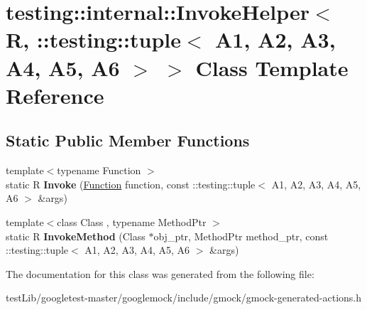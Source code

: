 \hypertarget{classtesting_1_1internal_1_1InvokeHelper_3_01R_00_01_1_1testing_1_1tuple_3_01A1_00_01A2_00_01A3_129338555c00c55487bfe9fa59e479ab}{}\section{testing\+:\+:internal\+:\+:Invoke\+Helper$<$ R, \+:\+:testing\+:\+:tuple$<$ A1, A2, A3, A4, A5, A6 $>$ $>$ Class Template Reference}
\label{classtesting_1_1internal_1_1InvokeHelper_3_01R_00_01_1_1testing_1_1tuple_3_01A1_00_01A2_00_01A3_129338555c00c55487bfe9fa59e479ab}
\subsection*{Static Public Member Functions}
\begin{DoxyCompactItemize}
\item 
\mbox{\label{classtesting_1_1internal_1_1InvokeHelper_3_01R_00_01_1_1testing_1_1tuple_3_01A1_00_01A2_00_01A3_129338555c00c55487bfe9fa59e479ab_abd80fc3954d529303e56f4410db782fc}} 
{\footnotesize template$<$typename Function $>$ }\\static R {\bfseries Invoke} (\hyperlink{structtesting_1_1internal_1_1Function}{Function} function, const \+::testing\+::tuple$<$ A1, A2, A3, A4, A5, A6 $>$ \&args)
\item 
\mbox{\label{classtesting_1_1internal_1_1InvokeHelper_3_01R_00_01_1_1testing_1_1tuple_3_01A1_00_01A2_00_01A3_129338555c00c55487bfe9fa59e479ab_aecdf0f71f5b2c0441b066f62e936805e}} 
{\footnotesize template$<$class Class , typename Method\+Ptr $>$ }\\static R {\bfseries Invoke\+Method} (Class $\ast$obj\+\_\+ptr, Method\+Ptr method\+\_\+ptr, const \+::testing\+::tuple$<$ A1, A2, A3, A4, A5, A6 $>$ \&args)
\end{DoxyCompactItemize}


The documentation for this class was generated from the following file\+:\begin{DoxyCompactItemize}
\item 
test\+Lib/googletest-\/master/googlemock/include/gmock/gmock-\/generated-\/actions.\+h\end{DoxyCompactItemize}

